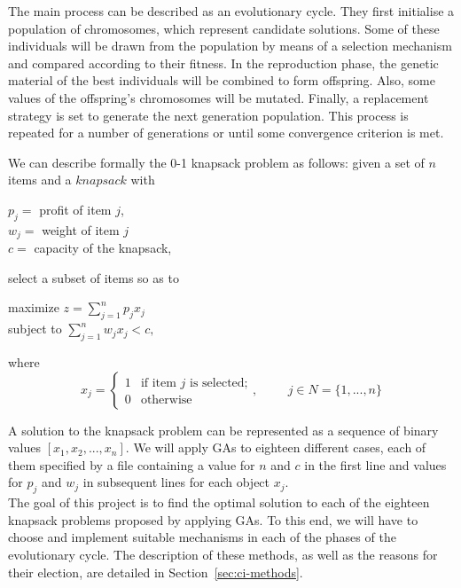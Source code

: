 \documentclass[anon]{CI}
\begin{document}
The main process can be described as an evolutionary cycle. They first initialise a population of chromosomes, which represent candidate solutions. Some of these individuals will be drawn from the population by means of a selection mechanism and compared according to their fitness. In the reproduction phase, the genetic material of the best individuals will be combined to form offspring. Also, some values of the offspring’s chromosomes will be mutated. Finally, a replacement strategy is set to generate the next generation population. This process is repeated for a number of generations or until some convergence criterion is met.

We can describe formally the 0-1 knapsack problem as follows: given a set of $n$ items and a $knapsack$ with
\begin{center}
    $p_j = $ profit of item $j$, \\
    $w_j = $ weight of item $j$ \\
    $c = $ capacity of the knapsack, \\
\end{center}
select a subset of items so as to \\
\begin{center}
    maximize $z = \displaystyle \sum_{j=1}^n p_j x_j$ \\
    subject to $\displaystyle \sum_{j=1}^n w_j x_j < c,$ \\
\end{center}
where
$$x_j =     
    \begin{cases}
      1 & \text{if item $j$ is selected;}\\
      0 & \text{otherwise}
    \end{cases}, \hspace{1cm}
j \in N = \{1,..., n\}
$$


A solution to the knapsack problem can be represented as a sequence of binary values $[x_1, x_2, ..., x_n]$. We will apply GAs to eighteen different cases, each of them specified by a file containing a value for $n$ and $c$ in the first line and values for $p_j$ and $w_j$ in subsequent lines for each object $x_j$. \\

The goal of this project is to find the optimal solution to each of the eighteen knapsack problems proposed by applying GAs. To this end, we will have to choose and implement suitable mechanisms in each of the phases of the evolutionary cycle. The description of these methods, as well as the reasons for their election, are detailed in Section~\ref{sec:ci-methods}.
\end{document}
